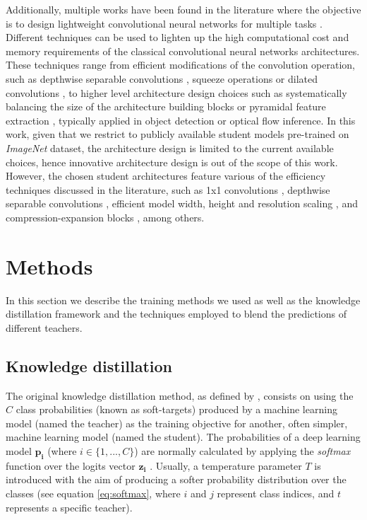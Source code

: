 \documentclass{elsarticle}
\begin{document}
	Additionally, multiple works have been found in the literature where the objective is to design lightweight convolutional neural networks for multiple tasks \cite{zhou2020, jeon2021, hui2018}. Different techniques can be used to lighten up the high computational cost and memory requirements of the classical convolutional neural networks architectures. These techniques range from efficient modifications of the convolution operation, such as depthwise separable convolutions \cite{chollet2017}, squeeze operations \cite{qiang2021} or dilated convolutions \cite{Yu2016}, to higher level architecture design choices such as systematically balancing the size of the architecture building blocks \cite{tan2019} or pyramidal feature extraction \cite{Lin2017}, typically applied in object detection or optical flow inference. In this work, given that we restrict to publicly available student models pre-trained on \textit{ImageNet} dataset, the architecture design is limited to the current available choices, hence innovative architecture design is out of the scope of this work. However, the chosen student architectures feature various of the efficiency techniques discussed in the literature, such as 1x1 convolutions \cite{szegedy2017}, depthwise separable convolutions \cite{chollet2017}, efficient model width, height and resolution scaling \cite{tan2019}, and compression-expansion blocks \cite{howard2017, sandler2018}, among others.
	
	\section{Methods} \label{sec:methods}
	In this section we describe the training methods we used as well as the knowledge distillation framework and the techniques employed to blend the predictions of different teachers.

	\subsection{Knowledge distillation} \label{sec:kd}
	The original knowledge distillation method, as defined by \citep{hinton2015}, consists on using the $C$ class probabilities (known as soft-targets) produced by a machine learning model (named the teacher) as the training objective for another, often simpler, machine learning model (named the student). The probabilities of a deep learning model $\mathbf{p_i}$ (where $i \in \{1,...,C\}$) are normally calculated by applying the \textit{softmax} function over the logits vector $\mathbf{z_i}$ \citep{goodfellow2016}. Usually, a temperature parameter $T$ is introduced with the aim of producing a softer probability distribution over the classes (see equation \ref{eq:softmax}, where $i$ and $j$ represent class indices, and $t$ represents a specific teacher).
\end{document}
